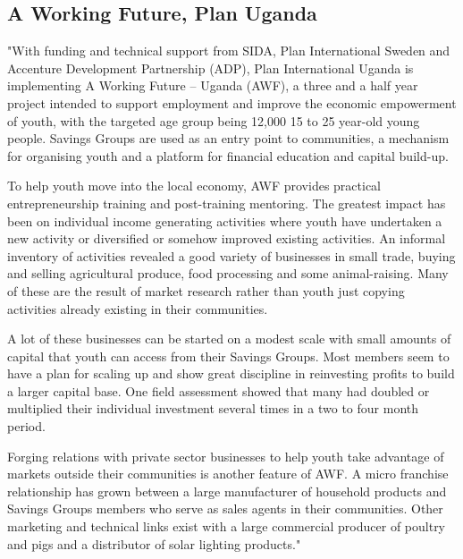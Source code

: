 \subsection{A Working Future, Plan Uganda}

"With funding and technical support from SIDA, Plan International Sweden and Accenture Development Partnership (ADP), Plan International Uganda is implementing A Working Future – Uganda (AWF), a three and a half year project intended to support employment and improve the economic empowerment of youth, with the targeted age group being 12,000 15 to 25 year-old young people.  Savings Groups are used as an entry point to communities, a mechanism for organising youth and a platform for financial education and capital build-up.

To help youth move into the local economy, AWF provides practical entrepreneurship training and post-training mentoring.  The greatest impact has been on individual income generating activities where youth have undertaken a new activity or diversified or somehow improved existing activities.  An informal inventory of activities revealed a good variety of businesses in small trade, buying and selling agricultural produce, food processing and some animal-raising.  Many of these are the result of market research rather than youth just copying activities already existing in their communities.

A lot of these businesses can be started on a modest scale with small amounts of capital that youth can access from their Savings Groups.  Most members seem to have a plan for scaling up and show great discipline in reinvesting profits to build a larger capital base.  One field assessment showed that many had doubled or multiplied their individual investment several times in a two to four month period.

Forging relations with private sector businesses to help youth take advantage of markets outside their communities is another feature of AWF.  A micro franchise relationship has grown between a large manufacturer of household products and Savings Groups members who serve as sales agents in their communities.  Other marketing and technical links exist with a large commercial producer of poultry and pigs and a distributor of solar lighting products."

